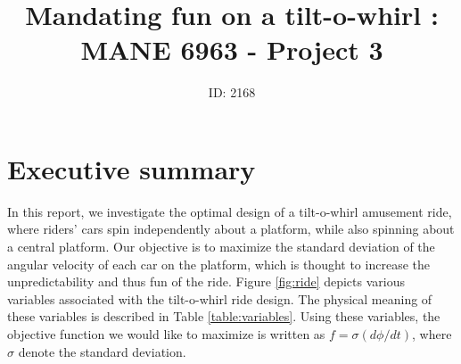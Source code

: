 \documentclass[11pt]{article}
\title{Mandating fun on a tilt-o-whirl : MANE 6963 - Project 3}
\author{ID: 2168}
\date{}
\begin{document}
\maketitle

\section{Executive summary}

In this report, we investigate the optimal design of a
tilt-o-whirl amusement ride, where riders' cars spin
independently about a platform, while also spinning
about a central platform. Our objective is to maximize
the standard deviation of the angular velocity of each
car on the platform, which is thought to increase
the unpredictability and thus fun of the ride.
Figure \ref{fig:ride} depicts various variables
associated with the tilt-o-whirl ride design.
The physical meaning of these variables is described
in Table \ref{table:variables}. Using these variables,
the objective function we would like to maximize is
written as $f = \sigma(d \phi / d t)$, where $\sigma$
denote the standard deviation.
\end{document}

